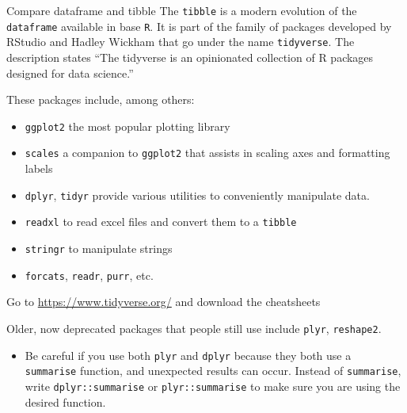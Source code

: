 \documentclass[
  11pt,
  ignorenonframetext,
  svgnames, handout, t]{beamer}
\providecommand{\tightlist}{%
  \setlength{\itemsep}{0pt}\setlength{\parskip}{0pt}}
\begin{document}
\begin{frame}[fragile]{Compare dataframe and tibble}
\protect\hypertarget{compare-dataframe-and-tibble-2}{}
The \texttt{tibble} is a modern evolution of the \texttt{dataframe}
available in base \texttt{R}. It is part of the family of packages
developed by RStudio and Hadley Wickham that go under the name
\texttt{tidyverse}. The description states ``The tidyverse is an
opinionated collection of R packages designed for data science.''

These packages include, among others:

\begin{itemize}
\tightlist
\item
  \texttt{ggplot2} the most popular plotting library
\item
  \texttt{scales} a companion to \texttt{ggplot2} that assists in
  scaling axes and formatting labels
\item
  \texttt{dplyr}, \texttt{tidyr} provide various utilities to
  conveniently manipulate data.
\item
  \texttt{readxl} to read excel files and convert them to a
  \texttt{tibble}
\item
  \texttt{stringr} to manipulate strings
\item
  \texttt{forcats}, \texttt{readr}, \texttt{purr}, etc.
\end{itemize}

Go to \url{https://www.tidyverse.org/} and download the cheatsheets

Older, now deprecated packages that people still use include
\texttt{plyr}, \texttt{reshape2}.

\begin{itemize}
\tightlist
\item
  Be careful if you use both \texttt{plyr} and \texttt{dplyr} because
  they both use a \texttt{summarise} function, and unexpected results
  can occur. Instead of \texttt{summarise}, write
  \texttt{dplyr::summarise} or \texttt{plyr::summarise} to make sure you
  are using the desired function.
\end{itemize}
\end{frame}
\end{document}
